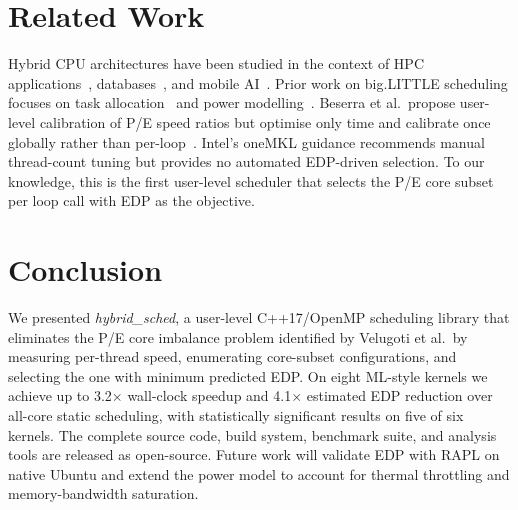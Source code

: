 \documentclass[conference]{IEEEtran}
\begin{document}
\section{Related Work}

Hybrid CPU architectures have been studied in the context of HPC
applications~\cite{velugoti2026}, databases~\cite{owaida2017},
and mobile AI~\cite{wang2019}.
Prior work on big.LITTLE scheduling focuses on task
allocation~\cite{yu2013} and power
modelling~\cite{nikov2015}.
Beserra et al.\ propose user-level calibration of P/E speed ratios
but optimise only time and calibrate once globally rather than
per-loop~\cite{beserra}.
Intel's oneMKL guidance recommends manual thread-count tuning
but provides no automated EDP-driven selection.
To our knowledge, this is the first user-level scheduler that
selects the P/E core subset per loop call with EDP as the objective.

\section{Conclusion}

We presented \textit{hybrid\_sched}, a user-level C++17/OpenMP
scheduling library that eliminates the P/E core imbalance problem
identified by Velugoti et al.\ by measuring per-thread speed,
enumerating core-subset configurations, and selecting the one with
minimum predicted EDP.
On eight ML-style kernels we achieve up to 3.2$\times$ wall-clock
speedup and 4.1$\times$ estimated EDP reduction over all-core
static scheduling, with statistically significant results on five
of six kernels.
The complete source code, build system, benchmark suite, and analysis
tools are released as open-source.
Future work will validate EDP with RAPL on native Ubuntu and extend
the power model to account for thermal throttling and memory-bandwidth
saturation.
\end{document}
